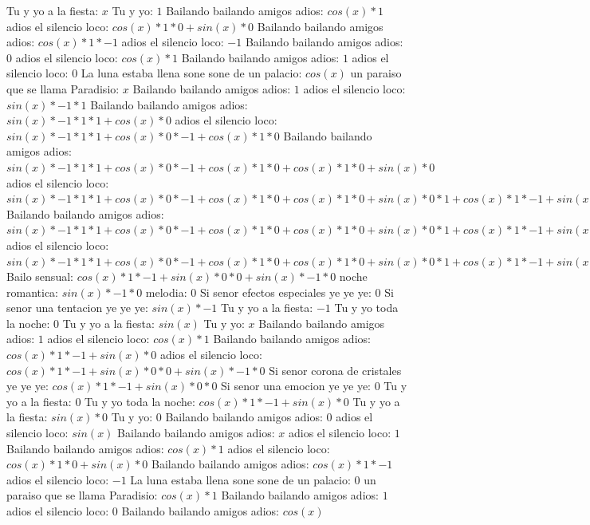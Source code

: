 \documentclass{article}
\begin{document}
\newline Tu y yo a la fiesta: $x$ Tu y yo: $1$  \newline Bailando bailando amigos adios: $cos(x)*1$ adios el silencio loco: $cos(x)*1*0+sin(x)*0$ Bailando bailando amigos adios: $cos(x)*1*-1$ adios el silencio loco: $-1$ Bailando bailando amigos adios: $0$  \newline adios el silencio loco: $cos(x)*1$ Bailando bailando amigos adios: $1$ adios el silencio loco: $0$  \newline La luna estaba llena sone sone de un palacio: $cos(x)$  \newline un paraiso que se llama Paradisio: $x$ Bailando bailando amigos adios: $1$  \newline adios el silencio loco: $sin(x)*-1*1$ Bailando bailando amigos adios: $sin(x)*-1*1*1+cos(x)*0$ adios el silencio loco: ${sin(x)*-1*1*1+cos(x)*0}*-1+cos(x)*1*0$ Bailando bailando amigos adios: ${sin(x)*-1*1*1+cos(x)*0}*-1+cos(x)*1*0+cos(x)*1*0+sin(x)*0$ adios el silencio loco: ${{sin(x)*-1*1*1+cos(x)*0}*-1+cos(x)*1*0+cos(x)*1*0+sin(x)*0}*1+{cos(x)*1*-1+sin(x)*0}*0$ Bailando bailando amigos adios: ${{sin(x)*-1*1*1+cos(x)*0}*-1+cos(x)*1*0+cos(x)*1*0+sin(x)*0}*1+{cos(x)*1*-1+sin(x)*0}*0+{cos(x)*1*-1+sin(x)*0}*0+sin(x)*-1*0$ adios el silencio loco: ${{sin(x)*-1*1*1+cos(x)*0}*-1+cos(x)*1*0+cos(x)*1*0+sin(x)*0}*1+{cos(x)*1*-1+sin(x)*0}*0+{cos(x)*1*-1+sin(x)*0}*0+sin(x)*-1*0$  \newline Bailo sensual: ${cos(x)*1*-1+sin(x)*0}*0+sin(x)*-1*0$  \newline noche romantica: $sin(x)*-1*0$ melodia: $0$ Si senor efectos especiales ye ye ye: $0$  \newline Si senor una tentacion ye ye ye: $sin(x)*-1$ Tu y yo a la fiesta: $-1$ Tu y yo toda la noche: $0$  \newline Tu y yo a la fiesta: $sin(x)$  \newline Tu y yo: $x$ Bailando bailando amigos adios: $1$  \newline adios el silencio loco: $cos(x)*1$ Bailando bailando amigos adios: $cos(x)*1*-1+sin(x)*0$ adios el silencio loco: ${cos(x)*1*-1+sin(x)*0}*0+sin(x)*-1*0$ Si senor corona de cristales ye ye ye: ${cos(x)*1*-1+sin(x)*0}*0$ Si senor una emocion ye ye ye: $0$ Tu y yo a la fiesta: $0$  \newline Tu y yo toda la noche: $cos(x)*1*-1+sin(x)*0$  \newline Tu y yo a la fiesta: $sin(x)*0$ Tu y yo: $0$ Bailando bailando amigos adios: $0$  \newline adios el silencio loco: $sin(x)$  \newline Bailando bailando amigos adios: $x$ adios el silencio loco: $1$  \newline Bailando bailando amigos adios: $cos(x)*1$ adios el silencio loco: $cos(x)*1*0+sin(x)*0$ Bailando bailando amigos adios: $cos(x)*1*-1$ adios el silencio loco: $-1$ La luna estaba llena sone sone de un palacio: $0$  \newline un paraiso que se llama Paradisio: $cos(x)*1$ Bailando bailando amigos adios: $1$ adios el silencio loco: $0$  \newline Bailando bailando amigos adios: $cos(x)$  \newline 
\end{document}
